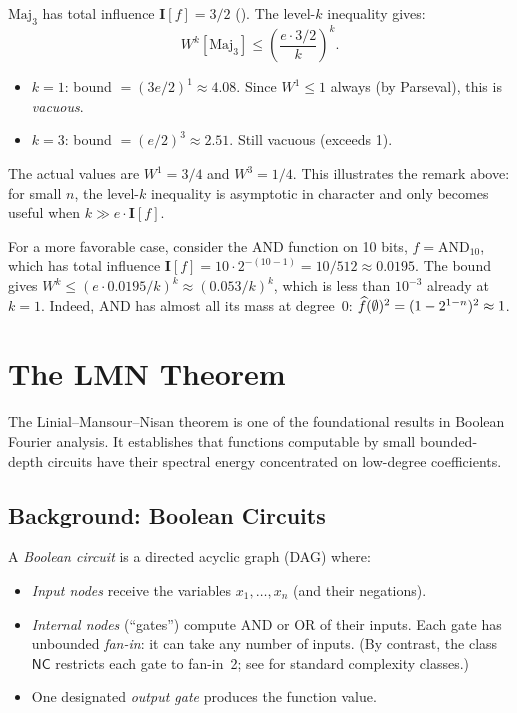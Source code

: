 \begin{example}\label{ex:level-k-numerical}
$\text{Maj}_3$ has total influence $\mathbf{I}[f] = 3/2$
(). The level-$k$ inequality gives:
\[
  W^k[\text{Maj}_3] \leq \left(\frac{e \cdot 3/2}{k}\right)^k.
\]
\begin{itemize}
  \item $k=1$: bound $= (3e/2)^1 \approx 4.08$. Since $W^1 \leq 1$
    always (by Parseval), this is \emph{vacuous}.
  \item $k=3$: bound $= (e/2)^3 \approx 2.51$. Still vacuous
    (exceeds 1).
\end{itemize}
The actual values are $W^1 = 3/4$ and $W^3 = 1/4$.
This illustrates the remark above: for small $n$, the level-$k$
inequality is asymptotic in character and only becomes
useful when $k \gg e \cdot \mathbf{I}[f]$.

\medskip
For a more favorable case, consider the AND function on 10 bits,
$f = \text{AND}_{10}$, which has total influence
$\mathbf{I}[f] = 10 \cdot 2^{-(10-1)} = 10/512 \approx 0.0195$.
The bound gives $W^k \leq (e \cdot 0.0195 / k)^k \approx (0.053/k)^k$,
which is less than $10^{-3}$ already at $k = 1$. Indeed, AND has
almost all its mass at degree~0: $\widehat{f}(\emptyset)^2 = (1 - 2^{1-n})^2 \approx 1$.
\end{example}


\section{The LMN Theorem}\label{sec:lmn}

The Linial--Mansour--Nisan theorem \citep{linial1989constant,linial1993constant}
is one of the foundational results in Boolean Fourier analysis. It
establishes that functions computable by small bounded-depth circuits
have their spectral energy concentrated on low-degree coefficients.

\subsection{Background: Boolean Circuits}\label{sec:circuits}

A \emph{Boolean circuit} is a directed acyclic graph (DAG) where:
\begin{itemize}
  \item \emph{Input nodes} receive the variables $x_1, \ldots, x_n$
    (and their negations).
  \item \emph{Internal nodes} (``gates'') compute AND or OR of their
    inputs. Each gate has unbounded \emph{fan-in}: it can take any
    number of inputs. (By contrast, the class $\mathsf{NC}$ restricts
    each gate to fan-in~2; see \citealp{arora2009computational} for
    standard complexity classes.)
  \item One designated \emph{output gate} produces the function value.
\end{itemize}

